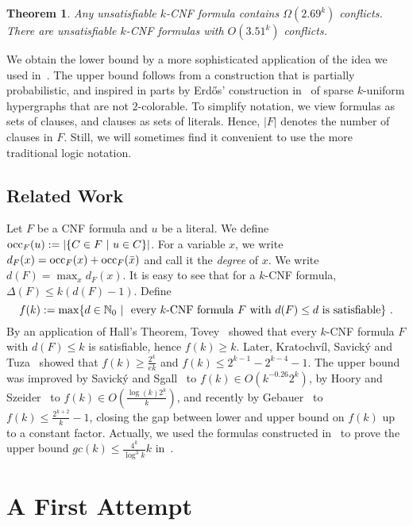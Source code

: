 \documentclass[a4paper, 11pt]{article}
\newtheorem{theorem}{Theorem}\newtheorem{proposition}[theorem]{Proposition}
\newcommand{\occ}{\ensuremath{{\rm{occ}}}}
\begin{document}
\begin{theorem}
  Any unsatisfiable $k$-CNF formula contains
  $\Omega\left(2.69^k\right)$ conflicts. There are unsatisfiable
  $k$-CNF formulas with $O\left(3.51^k\right)$ conflicts.
\label{main}
\end{theorem}

We obtain the lower bound by a more sophisticated application of the
idea we used in~\cite{SZ2008}. The upper bound follows from a
construction that is partially probabilistic, and inspired in parts by
Erd\H{o}s' construction in~\cite{Erdos1964} of sparse $k$-uniform
hypergraphs that are not $2$-colorable. To simplify notation, we view
formulas as sets of clauses, and clauses as sets of literals. Hence,
$|F|$ denotes the number of clauses in $F$. Still, we will sometimes
find it convenient to use the more traditional logic notation.

\subsection*{Related Work}

Let $F$ be a CNF formula and $u$ be a literal. We define $\occ_F(u) :=
| \{C \in F \ | \ u \in C\}|$. For a variable $x$, we write $d_F(x) =
\occ_F(x) + \occ_F(\bar{x})$ and call it the {\em degree} of $x$.
We write $d(F) = \max_x d_F(x)$. It is easy to see
that for a $k$-CNF formula, $\Delta(F) \leq k(d(F)-1)$. Define
$$
f(k)  :=  \max \{d \in \mathbb{N}_0 \ | \ \textnormal{ every }
k\textnormal{-CNF formula } F \textnormal{ with }
d(F) \leq d \textnormal{ is satisfiable} \} \ .\\
$$ 
By an
application of Hall's Theorem, Tovey~\cite{Tovey1984} showed that every
$k$-CNF formula $F$ with $d(F) \leq k$ is satisfiable, hence $f(k)
\geq k$. Later, Kratochv\'il, Savick\'y and Tuza~\cite{KST1993} showed
that $f(k) \geq \frac{2^k}{ek}$ and
$f(k) \leq 2^{k-1} - 2^{k-4} - 1$. The upper bound was improved by
Savick\'{y} and Sgall~\cite{SS2000} to $f(k) \in O(k^{-0.26}2^k)$, by
Hoory and Szeider~\cite{HS2006} to $f(k) \in
O\left(\frac{\log(k)2^k}{k}\right)$, and recently by
Gebauer~\cite{Gebauer2009} to $f(k) \leq \frac{2^{k+2}}{k}-1$,
closing the gap between lower and upper bound on $f(k)$ up to a
constant factor. Actually, we used the formulas constructed in~\cite{HS2006}
to prove the upper bound $gc(k) \leq
\frac{4^k}{\log^3 k}{k}$ in~\cite{SZ2008}.\\




\section{A First Attempt} \label{section-first-attempt}
\end{document}
